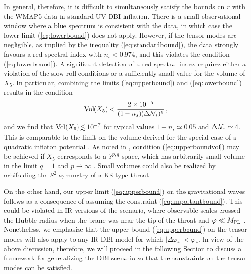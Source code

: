 In general, therefore, it is difficult to simultaneously satisfy 
the bounds on $r$ with the WMAP5 data
in standard UV DBI inflation. There is a 
small observational window where a blue spectrum is consistent 
with the data, in which case the lower limit 
(\ref{eq:lowerbound}) does not apply. 
However, if the tensor modes are negligible,
as implied by the inequality (\ref{eq:standardbound}), the 
data strongly favours a red spectral index with $n_s < 0.974$,
and this violates the condition (\ref{eq:lowerbound}). A significant 
detection of a red spectral index requires either a 
violation of the slow-roll conditions or a sufficiently 
small value for the volume of $X_5$. 
In particular, combining the limits
(\ref{eq:upperbound}) and (\ref{eq:lowerbound}) results in the condition 
% 
\begin{equation}
\label{eq:upperboundvol}
\mathrm{Vol}(X_5) < \frac{2 \times 10^{-5}}{(1-n_s) 
(\Delta \mathcal{N}_{*} )^6}  \,,
\end{equation}
% 
and we find that $\mathrm{Vol}(X_5) \, \lsim \, 10^{-7}$ 
for typical values $1-n_s \simeq 0.05$ and 
$\Delta \mathcal{N}_* \simeq 4$. 
This 
is comparable to the limit on the volume derived for the special case of a 
quadratic inflaton potential \cite{bmpaper}.  
As noted in \cite{bmpaper,bean}, condition 
(\ref{eq:upperboundvol}) may be achieved 
if $X_5$ corresponds to a $Y^{p,q}$ space, 
which has arbitrarily small volume in the limit  
$q =1$ and $p \rightarrow \infty$ \cite{gauntlett}. 
Small volumes could also be realized 
by orbifolding the $S^2$ symmetry of a KS-type throat. 


On the other hand, 
our upper limit (\ref{eq:upperbound}) on the gravitational waves 
follows as a consequence of assuming 
the constraint (\ref{eq:importantbound}). This  
could be violated in IR versions of the scenario, where
observable scales crossed the Hubble radius when the 
brane was near the tip of the throat and $\varphi \ll M_{\mathrm{PL}}$
\cite{brane12,brane14}. 
Nonetheless, we emphasize that the upper bound (\ref{eq:upperbound})
on the tensor modes 
will also apply to any IR DBI model for which 
$|\Delta \varphi_* | < \varphi_*$.  
In view of the above discussion, therefore, 
we will proceed in the following Section
to discuss a framework for generalizing the DBI scenario so 
that the constraints on the tensor modes can be satisfied. 
% 
% 
% 
% 

